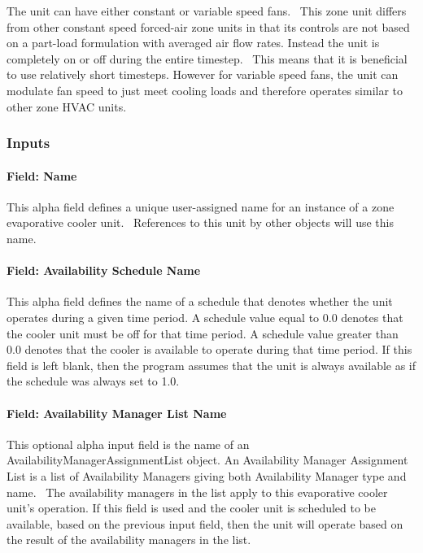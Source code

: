 The unit can have either constant or variable speed fans.~ This zone unit differs from other constant speed forced-air zone units in that its controls are not based on a part-load formulation with averaged air flow rates. Instead the unit is completely on or off during the entire timestep.~ This means that it is beneficial to use relatively short timesteps. However for variable speed fans, the unit can modulate fan speed to just meet cooling loads and therefore operates similar to other zone HVAC units.

\subsubsection{Inputs}\label{inputs-4-040}

\paragraph{Field: Name}\label{field-name-4-035}

This alpha field defines a unique user-assigned name for an instance of a zone evaporative cooler unit.~ References to this unit by other objects will use this name.

\paragraph{Field: Availability Schedule Name}\label{field-availability-schedule-name-4-007}

This alpha field defines the name of a schedule that denotes whether the unit operates during a given time period. A schedule value equal to 0.0 denotes that the cooler unit must be off for that time period. A schedule value greater than 0.0 denotes that the cooler is available to operate during that time period. If this field is left blank, then the program assumes that the unit is always available as if the schedule was always set to 1.0.

\paragraph{Field: Availability Manager List Name}\label{field-availability-manager-list-name-3}

This optional alpha input field is the name of an AvailabilityManagerAssignmentList object. An Availability Manager Assignment List is a list of Availability Managers giving both Availability Manager type and name.~ The availability managers in the list apply to this evaporative cooler unit's operation. If this field is used and the cooler unit is scheduled to be available, based on the previous input field, then the unit will operate based on the result of the availability managers in the list.


